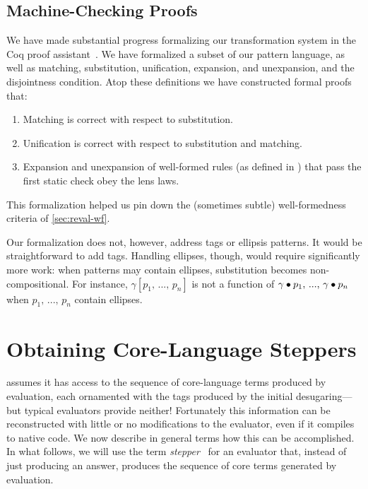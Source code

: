 \subsection{Machine-Checking Proofs}
\label{sec:reval-coq}

We have made substantial progress formalizing our transformation system in
the Coq proof assistant~\cite{coq-manual}. We have formalized a subset of
our pattern language, as well as matching, substitution, unification,
expansion, and unexpansion, and the disjointness condition. Atop these
definitions we have constructed formal proofs that:
\begin{enumerate}
\item Matching is correct with respect to substitution.
\item Unification is correct with respect to substitution and matching.
\item Expansion and unexpansion of well-formed rules (as defined in
  ) that pass the first static check obey the
  lens laws.
\end{enumerate}
This formalization helped us pin down the (sometimes subtle)
well-formedness criteria of \cref{sec:reval-wf}.

Our formalization does not, however, address tags or ellipsis patterns.
It would be straightforward to add tags. Handling ellipses, though, would
require significantly more work: when patterns may contain ellipses,
substitution becomes non-compositional. For instance, $\gamma
[p_1,\,...,\,p_n]$ is not a function of $\gamma \bullet p_1,\,...,\,\gamma \bullet p_n$
when $p_1,\,...,\,p_n$ contain ellipses.



\section{Obtaining Core-Language Steppers}
\label{sec:reval-lang}


{\Resugarer} assumes it has access to the sequence of core-language terms
produced by evaluation, each ornamented with the tags produced by the
initial desugaring---but typical evaluators provide neither!
Fortunately this information can be reconstructed with little or no
modifications to the evaluator, even if it compiles to native code. We now
describe in general terms how this can be accomplished.  In what follows,
we will use the term \emph{stepper}~\cite{racket-stepper} for an
evaluator that, instead of just producing an answer, produces
the sequence of core terms generated by evaluation.

